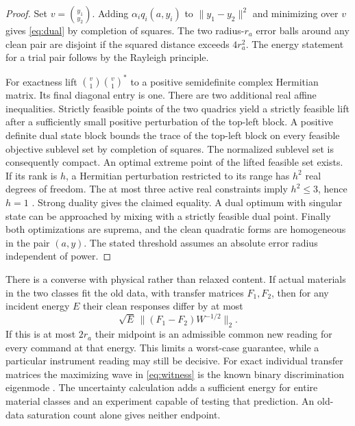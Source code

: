 \begin{proof}
Set $v=\binom{y_1}{y_2}$. Adding $\alpha_i q_i(a,y_i)$ to $\|y_1-y_2\|^2$ and minimizing over $v$ gives \eqref{eq:dual} by completion of squares. The two radius-$r_a$ error balls around any clean pair are disjoint if the squared distance exceeds $4r_a^2$. The energy statement for a trial pair follows by the Rayleigh principle.

For exactness lift $\binom{v}{1}\binom{v}{1}^{\!*}$ to a positive semidefinite complex Hermitian matrix. Its final diagonal entry is one. There are two additional real affine inequalities. Strictly feasible points of the two quadrics yield a strictly feasible lift after a sufficiently small positive perturbation of the top-left block. A positive definite dual state block bounds the trace of the top-left block on every feasible objective sublevel set by completion of squares. The normalized sublevel set is consequently compact. An optimal extreme point of the lifted feasible set exists. If its rank is $h$, a Hermitian perturbation restricted to its range has $h^2$ real degrees of freedom. The at most three active real constraints imply $h^2\leq3$, hence $h=1$ \cite{huang}. Strong duality gives the claimed equality. A dual optimum with singular state can be approached by mixing with a strictly feasible dual point. Finally both optimizations are suprema, and the clean quadratic forms are homogeneous in the pair $(a,y)$. The stated threshold assumes an absolute error radius independent of power.
\end{proof}

There is a converse with physical rather than relaxed content. If actual materials in the two classes fit the old data, with transfer matrices $F_1,F_2$, then for any incident energy $E$ their clean responses differ by at most
\begin{equation}
       \sqrt E\,\|(F_1-F_2)W^{-1/2}\|_2 .                    \label{eq:witness}
\end{equation}
If this is at most $2r_a$ their midpoint is an admissible common new reading for every command at that energy. This limits a worst-case guarantee, while a particular instrument reading may still be decisive. For exact individual transfer matrices the maximizing wave in \eqref{eq:witness} is the known binary discrimination eigenmode \cite{bouchet}. The uncertainty calculation adds a sufficient energy for entire material classes and an experiment capable of testing that prediction. An old-data saturation count alone gives neither endpoint.

